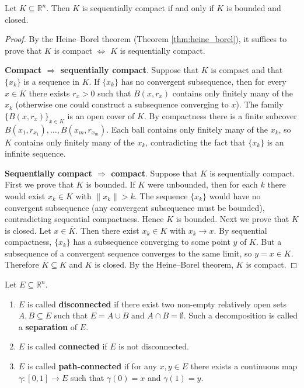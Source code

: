 \begin{theorem}\label{thm:bolzano_weierstrass}
Let $K \subseteq \mathbb{R}^n$. Then $K$ is sequentially compact if and only if $K$ is bounded and closed.
\end{theorem}

\begin{proof}
By the Heine--Borel theorem (Theorem \ref{thm:heine_borel}), it suffices to prove that $K$ is compact $\iff$ $K$ is sequentially compact.

\textbf{Compact $\Rightarrow$ sequentially compact}. Suppose that $K$ is compact and that $\{x_k\}$ is a sequence in $K$. If $\{x_k\}$ has no convergent subsequence, then for every $x \in K$ there exists $r_x > 0$ such that $B(x, r_x)$ contains only finitely many of the $x_k$ (otherwise one could construct a subsequence converging to $x$). The family $\{B(x, r_x)\}_{x \in K}$ is an open cover of $K$. By compactness there is a finite subcover $B(x_1, r_{x_1}), \dots, B(x_m, r_{x_m})$. Each ball contains only finitely many of the $x_k$, so $K$ contains only finitely many of the $x_k$, contradicting the fact that $\{x_k\}$ is an infinite sequence.

\textbf{Sequentially compact $\Rightarrow$ compact}. Suppose that $K$ is sequentially compact. First we prove that $K$ is bounded. If $K$ were unbounded, then for each $k$ there would exist $x_k \in K$ with $\|x_k\| > k$. The sequence $\{x_k\}$ would have no convergent subsequence (any convergent subsequence must be bounded), contradicting sequential compactness. Hence $K$ is bounded. Next we prove that $K$ is closed. Let $x \in \overline{K}$. Then there exist $x_k \in K$ with $x_k \to x$. By sequential compactness, $\{x_k\}$ has a subsequence converging to some point $y$ of $K$. But a subsequence of a convergent sequence converges to the same limit, so $y = x \in K$. Therefore $\overline{K} \subseteq K$ and $K$ is closed. By the Heine--Borel theorem, $K$ is compact.
\end{proof}

\begin{definition}[Connectedness]\label{def:connectedness}
Let $E \subseteq \mathbb{R}^n$.
\begin{enumerate}[label=(\roman*)]
    \item $E$ is called \textbf{disconnected} if there exist two non-empty relatively open sets $A, B \subseteq E$ such that $E = A \cup B$ and $A \cap B = \emptyset$. Such a decomposition is called a \textbf{separation} of $E$.
    \item $E$ is called \textbf{connected} if $E$ is not disconnected.
    \item $E$ is called \textbf{path-connected} if for any $x, y \in E$ there exists a continuous map $\gamma: [0, 1] \to E$ such that $\gamma(0) = x$ and $\gamma(1) = y$.
\end{enumerate}
\end{definition}

